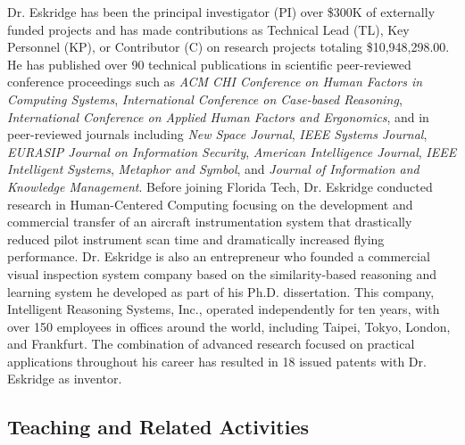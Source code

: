 \documentclass[12pt,letterpaper]{report}
\begin{document}
Dr. Eskridge has been the principal investigator (PI) over \$300K of externally funded projects and has made contributions as Technical Lead (TL), Key Personnel (KP), or Contributor (C) on research projects totaling \$10,948,298.00.   He has published over 90 technical publications in scientific peer-reviewed conference proceedings such as \textit{ACM CHI Conference on Human Factors in Computing Systems}, \textit{International Conference on Case-based Reasoning}, \textit{International Conference on Applied Human Factors and Ergonomics}, and in peer-reviewed journals including \textit{New Space Journal}, \textit{IEEE Systems Journal}, \textit{EURASIP Journal on Information Security}, \textit{American Intelligence Journal}, \textit{IEEE Intelligent Systems}, \textit{Metaphor and Symbol}, and \textit{Journal of Information and Knowledge Management}. Before joining Florida Tech, Dr. Eskridge conducted research in Human-Centered Computing focusing on the development and commercial transfer of an aircraft instrumentation system that drastically reduced pilot instrument scan time and dramatically increased flying performance.  Dr. Eskridge is also an entrepreneur who founded a commercial visual inspection system company based on the similarity-based reasoning and learning system he developed as part of his Ph.D. dissertation.  This company, Intelligent Reasoning Systems, Inc., operated independently for ten years, with over 150 employees in offices around the world, including Taipei, Tokyo, London, and Frankfurt.  The combination of advanced research focused on practical applications throughout his career has resulted in 18 issued patents with Dr. Eskridge as inventor. 

\subsection*{Teaching and Related Activities}
\label{teaching}
\end{document}

